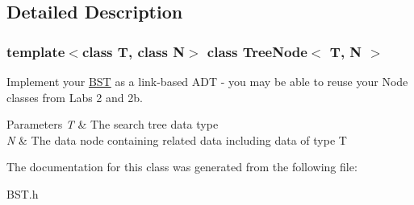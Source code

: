 \subsection{Detailed Description}
\subsubsection*{template$<$class T, class N$>$\newline
class Tree\+Node$<$ T, N $>$}

Implement your \hyperlink{class_b_s_t}{B\+ST} as a link-\/based A\+DT -\/ you may be able to reuse your Node classes from Labs 2 and 2b. 
\begin{DoxyParams}{Parameters}
{\em T} & The search tree data type \\
\hline
{\em N} & The data node containing related data including data of type T \\
\hline
\end{DoxyParams}


The documentation for this class was generated from the following file\+:\begin{DoxyCompactItemize}
\item 
B\+S\+T.\+h\end{DoxyCompactItemize}
